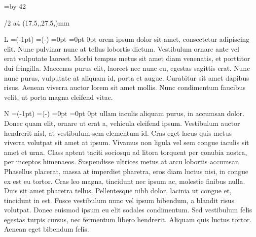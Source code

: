 \fontfam[ebgaramond]

\typosize[12/14]

\vsize=\topskip \advance \vsize by 42\baselineskip

\parskip0pt
\parindent\baselineskip

\margins/2 a4 (17.5,,27.5,)mm

\newif\ifblue \bluetrue

\def\switchcolor{
	\ifblue
		\def\initialcolor{\Red}%
		\bluefalse
	\else
		\def\initialcolor{\Blue}%
		\bluetrue
	\fi
}

\def\initial #1{%
	\par\null\par
	\switchcolor
	\setbox0\hbox{\initialcolor\typoscale[2700/]#1}%
	\dimen0=\dimexpr(\wd0-1pt)
	\dimen1=\dimexpr(\hsize-\dimen0)\relax
	\ht0=0pt \dp0=0pt%
	\moveleft 4pt \box0
	\vskip-2\baselineskip
	\parshape 3 \dimen0 \dimen1   0pt \hsize
	\noindent
}


\initial Lorem ipsum dolor sit amet, consectetur adipiscing elit. Nunc pulvinar nunc at tellus lobortis dictum. Vestibulum ornare ante vel erat vulputate laoreet. Morbi tempus metus sit amet diam venenatis, et porttitor dui fringilla. Maecenas purus elit, laoreet nec nunc eu, egestas sagittis erat. Nunc nunc purus, vulputate at aliquam id, porta et augue. Curabitur sit amet dapibus risus. Aenean viverra auctor lorem sit amet mollis. Nunc condimentum faucibus velit, ut porta magna eleifend vitae.

\initial Nullam iaculis aliquam purus, in accumsan dolor. Donec quam elit, ornare ut erat a, vehicula eleifend ipsum. Vestibulum auctor hendrerit nisl, at vestibulum sem elementum id. Cras eget lacus quis metus viverra volutpat sit amet at ipsum. Vivamus non ligula vel sem congue iaculis sit amet et urna. Class aptent taciti sociosqu ad litora torquent per conubia nostra, per inceptos himenaeos. Suspendisse ultrices metus at arcu lobortis accumsan. Phasellus placerat, massa at imperdiet pharetra, eros diam luctus nisi, in congue ex est eu tortor. Cras leo magna, tincidunt nec ipsum ac, molestie finibus nulla. Duis sit amet pharetra tellus. Pellentesque nibh dolor, lacinia ut congue et, tincidunt in est. Fusce vestibulum nunc vel ipsum bibendum, a blandit risus volutpat. Donec euismod ipsum eu elit sodales condimentum. Sed vestibulum felis egestas turpis cursus, nec fermentum libero hendrerit. Aliquam quis luctus tortor. Aenean eget bibendum felis.

